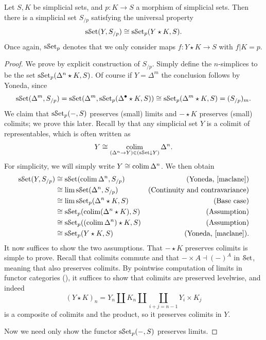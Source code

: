 \begin{proposition}\label{1.2.9.1}
	Let $S,K$ be simplicial sets, and $p : K \to S$ a morphism of simplicial sets. Then there is a simplicial set $S_{/p} $ satisfying the universal property
	\[
		\mathrm{s}\mathcal{S}\mathrm{et} (Y,S_{/p} )\cong \mathrm{s}\mathcal{S}\mathrm{et} _p(Y\star K,S)
	.\]
	Once again, $\mathrm{s}\mathcal{S}\mathrm{et} _p$ denotes that we only consider maps $f : Y\star K \to S$ with $f|K=p$.
\end{proposition}
\begin{proof}
	We prove by explicit construction of $S_{/p} $. Simply define the $n$-simplices to be the set $\mathrm{s}\mathcal{S}\mathrm{et} _p(\Delta ^n\star K,S)$. Of course if $Y=\Delta ^m$ the conclusion follows by Yoneda, since
	\[
		\mathrm{s}\mathcal{S}\mathrm{et} (\Delta ^m,S_{/p})= \mathrm{s}\mathcal{S}\mathrm{et} (\Delta ^m,\mathrm{s}\mathcal{S}\mathrm{et} _p(\Delta^{\bullet} \star K,S)) \cong \mathrm{s}\mathcal{S}\mathrm{et} _p(\Delta ^m \star K,S)=(S_{/p} )_m
	.\]
	We claim that $\mathrm{s}\mathcal{S}\mathrm{et} _p(-,S)$ preserves (small) limits and $-\star K$ preserves (small) colimits; we prove this later. Recall by \cite{maclane} that any simplicial set $Y$ is a colimit of representables, which is often written as
	\[
		Y\cong \operatorname*{colim}_{(\Delta ^n\to Y)\in(\mathrm{s}\mathcal{S}\mathrm{et}\downarrow Y)} \Delta ^n
	.\]
	For simplicity, we will simply write $Y\cong \operatorname*{colim} \Delta ^n$. We then obtain
	\begin{align*}
		\mathrm{s}\mathcal{S}\mathrm{et} (Y,S_{/p} )&\cong \mathrm{s}\mathcal{S}\mathrm{et}(\operatorname*{colim} \Delta ^n,S_{/p} )&\text{(Yoneda, \cite{maclane})} \\
				 &\cong \lim \mathrm{s}\mathcal{S}\mathrm{et} (\Delta ^n,S_{/p} )&\text{(Continuity and contravariance)} \\
				 &\cong \lim \mathrm{s}\mathcal{S}\mathrm{et}_p(\Delta ^n \star K,S)&\text{(Base case)} \\
				 &\cong \mathrm{s}\mathcal{S}\mathrm{et}_p(\operatorname*{colim} (\Delta ^n\star K),S)&\text{(Assumption)} \\
				 &\cong \mathrm{s}\mathcal{S}\mathrm{et} _p((\operatorname*{colim} \Delta ^n)\star K,S)&\text{(Assumption)} \\
				 &\cong \mathrm{s}\mathcal{S}\mathrm{et}_p(Y\star K,S)&\text{(Yoneda, \cite{maclane})}
	.\end{align*}
	It now suffices to show the two assumptions. That $-\star K$ preserves colimits is simple to prove. Recall that colimits commute and that $-\times A \dashv (-)^A$ in $\mathcal{S}\mathrm{et} $, meaning that also preserves colimits. By pointwise computation of limits in functor categories (\cite{maclane}), it suffices to show that colimits are preserved levelwise, and indeed
	\[
		(Y\star K)_n=Y_n \amalg K_n \amalg \coprod_{i+j=n-1} Y_i\times K_j
	\]
	is a composite of colimits and the product, so it preserves colimits in $Y$.

	Now we need only show the functor $\mathrm{s}\mathcal{S}\mathrm{et} _p(-,S)$ preserves limits.


\end{proof}
